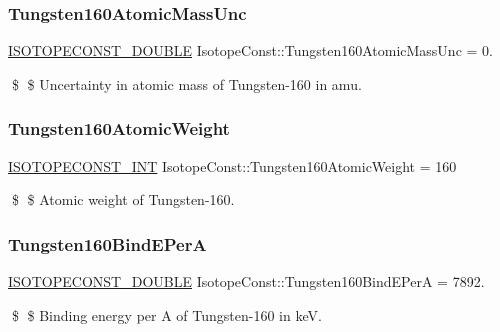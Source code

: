 \subsubsection{\texorpdfstring{Tungsten160\+Atomic\+Mass\+Unc}{Tungsten160AtomicMassUnc}}
{\footnotesize\ttfamily \mbox{\hyperlink{group___isotope_const-_macros_ga8f45a7272ce02c0b4c65c44636ed719a}{I\+S\+O\+T\+O\+P\+E\+C\+O\+N\+S\+T\+\_\+\+D\+O\+U\+B\+LE}} Isotope\+Const\+::\+Tungsten160\+Atomic\+Mass\+Unc = 0.}

\$ \$ Uncertainty in atomic mass of Tungsten-\/160 in amu. \mbox{\label{group___isotope_const-_tungsten-_w160_gab99cf53f7b262967b0a46cabf53657c5}} 
\subsubsection{\texorpdfstring{Tungsten160\+Atomic\+Weight}{Tungsten160AtomicWeight}}
{\footnotesize\ttfamily \mbox{\hyperlink{group___isotope_const-_macros_ga5f18360b3e99483a35c32d789e62621c}{I\+S\+O\+T\+O\+P\+E\+C\+O\+N\+S\+T\+\_\+\+I\+NT}} Isotope\+Const\+::\+Tungsten160\+Atomic\+Weight = 160}

\$ \$ Atomic weight of Tungsten-\/160. \mbox{\label{group___isotope_const-_tungsten-_w160_ga74e67cde9f5518f853399bdc262a60d5}} 
\subsubsection{\texorpdfstring{Tungsten160\+Bind\+E\+PerA}{Tungsten160BindEPerA}}
{\footnotesize\ttfamily \mbox{\hyperlink{group___isotope_const-_macros_ga8f45a7272ce02c0b4c65c44636ed719a}{I\+S\+O\+T\+O\+P\+E\+C\+O\+N\+S\+T\+\_\+\+D\+O\+U\+B\+LE}} Isotope\+Const\+::\+Tungsten160\+Bind\+E\+PerA = 7892.}

\$ \$ Binding energy per A of Tungsten-\/160 in keV. \mbox{\label{group___isotope_const-_tungsten-_w160_gaad5dd6aa4fbbb435c433a32eb8217ba5}} 
